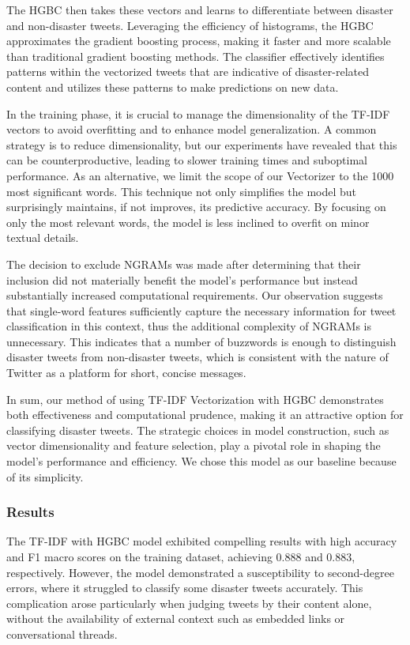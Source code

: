 \documentclass[10pt,table]{article}
\begin{document}
The HGBC then takes these vectors and learns to differentiate between disaster and non-disaster tweets. Leveraging the efficiency of histograms, the HGBC approximates the gradient boosting process, making it faster and more scalable than traditional gradient boosting methods. The classifier effectively identifies patterns within the vectorized tweets that are indicative of disaster-related content and utilizes these patterns to make predictions on new data.

In the training phase, it is crucial to manage the dimensionality of the TF-IDF vectors to avoid overfitting and to enhance model generalization. A common strategy is to reduce dimensionality, but our experiments have revealed that this can be counterproductive, leading to slower training times and suboptimal performance. As an alternative, we limit the scope of our Vectorizer to the 1000 most significant words. This technique not only simplifies the model but surprisingly maintains, if not improves, its predictive accuracy. By focusing on only the most relevant words, the model is less inclined to overfit on minor textual details.

The decision to exclude NGRAMs was made after determining that their inclusion did not materially benefit the model's performance but instead substantially increased computational requirements. Our observation suggests that single-word features sufficiently capture the necessary information for tweet classification in this context, thus the additional complexity of NGRAMs is unnecessary. This indicates that a number of buzzwords is enough to distinguish disaster tweets from non-disaster tweets, which is consistent with the nature of Twitter as a platform for short, concise messages.

In sum, our method of using TF-IDF Vectorization with HGBC demonstrates both effectiveness and computational prudence, making it an attractive option for classifying disaster tweets. The strategic choices in model construction, such as vector dimensionality and feature selection, play a pivotal role in shaping the model's performance and efficiency. We chose this model as our baseline because of its simplicity.

\subsubsection{Results}
The TF-IDF with HGBC model exhibited compelling results with high accuracy and F1 macro scores on the training dataset, achieving 0.888 and 0.883, respectively. However, the model demonstrated a susceptibility to second-degree errors, where it struggled to classify some disaster tweets accurately. This complication arose particularly when judging tweets by their content alone, without the availability of external context such as embedded links or conversational threads.
\end{document}
